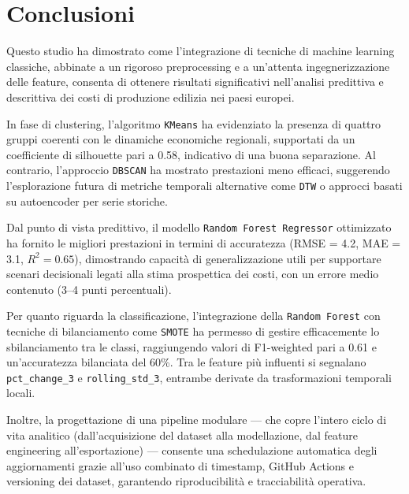 \documentclass[conference]{IEEEtran}
\begin{document}
{\section*{\LARGE \textbf{Conclusioni}}

Questo studio ha dimostrato come l'integrazione di tecniche di machine learning classiche, abbinate a un rigoroso preprocessing e a un’attenta ingegnerizzazione delle feature, consenta di ottenere risultati significativi nell’analisi predittiva e descrittiva dei costi di produzione edilizia nei paesi europei.

In fase di clustering, l’algoritmo \texttt{KMeans} ha evidenziato la presenza di quattro gruppi coerenti con le dinamiche economiche regionali, supportati da un coefficiente di silhouette pari a 0.58, indicativo di una buona separazione. Al contrario, l’approccio \texttt{DBSCAN} ha mostrato prestazioni meno efficaci, suggerendo l’esplorazione futura di metriche temporali alternative come \texttt{DTW} o approcci basati su autoencoder per serie storiche.

Dal punto di vista predittivo, il modello \texttt{Random Forest Regressor} ottimizzato ha fornito le migliori prestazioni in termini di accuratezza (RMSE = 4.2, MAE = 3.1, $R^2 = 0.65$), dimostrando capacità di generalizzazione utili per supportare scenari decisionali legati alla stima prospettica dei costi, con un errore medio contenuto (3–4 punti percentuali).

Per quanto riguarda la classificazione, l’integrazione della \texttt{Random Forest} con tecniche di bilanciamento come \texttt{SMOTE} ha permesso di gestire efficacemente lo sbilanciamento tra le classi, raggiungendo valori di F1-weighted pari a 0.61 e un'accuratezza bilanciata del 60\%. Tra le feature più influenti si segnalano \texttt{pct\_change\_3} e \texttt{rolling\_std\_3}, entrambe derivate da trasformazioni temporali locali.

Inoltre, la progettazione di una pipeline modulare — che copre l’intero ciclo di vita analitico (dall’acquisizione del dataset alla modellazione, dal feature engineering all’esportazione) — consente una schedulazione automatica degli aggiornamenti grazie all’uso combinato di timestamp, GitHub Actions e versioning dei dataset, garantendo riproducibilità e tracciabilità operativa.

}
\end{document}

